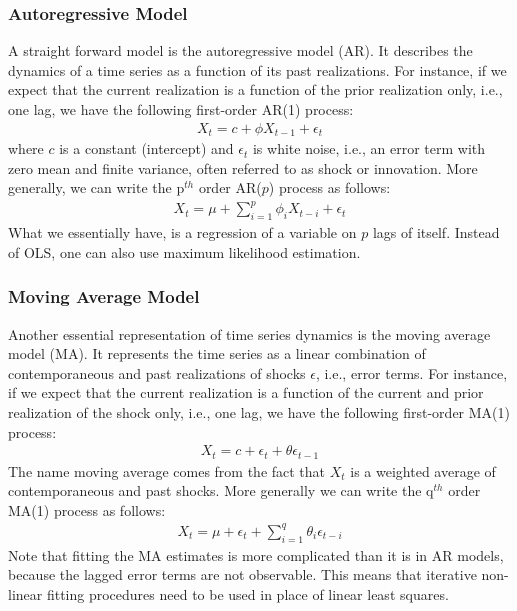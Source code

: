 \documentclass[xcolor=dvipsnames, english, 8pt]{beamer}
\begin{document}
\begin{frame}
    \frametitle{Autoregressive Model}

A straight forward model is the autoregressive model (AR). It describes the dynamics of a time series as a function of its past realizations. For instance, if we expect that the current realization is a function of the prior realization only, i.e., one lag, we have the following first-order AR(1) process:
\begin{align}
    X_t = c + \phi X_{t-1} + \epsilon_t
\end{align}
where $c$ is a constant (intercept) and $\epsilon_t$ is white noise, i.e., an error term with zero mean and finite variance, often referred to as shock or innovation. More generally, we can write the p$^{th}$ order AR($p$) process as follows:
\begin{align}
    X_t = \mu + \sum\limits_{i=1}^p\phi_i X_{t-i} + \epsilon_t
\end{align}
What we essentially have, is a regression of a variable on $p$ lags of itself. Instead of OLS, one can also use maximum likelihood estimation.

\end{frame}

\begin{frame}
    \frametitle{Moving Average Model}

    Another essential representation of time series dynamics is the moving average model (MA). It represents the time series as a linear combination of contemporaneous and past realizations of shocks $\epsilon$, i.e., error terms. For instance, if we expect that the current realization is a function of the current and prior realization of the shock only, i.e., one lag, we have the following first-order MA(1) process:
\begin{align}
    X_t = c + \epsilon_t +\theta \epsilon_{t-1}
\end{align}
 The name moving average comes from the fact that $X_t$ is a weighted average of contemporaneous and past shocks. More generally  we can write the q$^{th}$ order MA(1) process as follows:
 \begin{align}
     X_t = \mu +\epsilon_{t}+ \sum\limits_{i=1}^q\theta_i \epsilon_{t-i}
 \end{align}
 Note that fitting the MA estimates is more complicated than it is in AR models, because the {\color{red}lagged error terms are not observable}. This means that iterative non-linear fitting procedures need to be used in place of linear least squares.
\end{frame}
\end{document}
